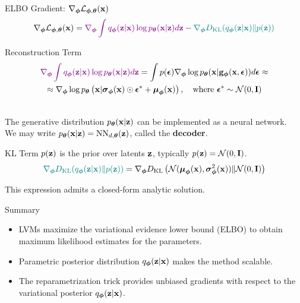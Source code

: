\documentclass{beamer}
\renewcommand{\eqpause}{}
\begin{document}
\begin{frame}{ELBO Gradient: $\nabla_{\boldsymbol{\phi}} \mathcal{L}_{\boldsymbol{\phi}, \boldsymbol{\theta}}(\mathbf{x})$}
	\vspace{-0.3cm}
	\[
		\nabla_{\boldsymbol{\phi}} \mathcal{L}_{\boldsymbol{\phi}, \boldsymbol{\theta}}(\mathbf{x}) = {\color{violet}\nabla_{\boldsymbol{\phi}} \int q_{\boldsymbol{\phi}}(\mathbf{z}| \mathbf{x})\log p_{\boldsymbol{\theta}}(\mathbf{x} | \mathbf{z}) d \mathbf{z}} - {\color{teal}\nabla_{\boldsymbol{\phi}} D_\mathrm{KL}(q_{\boldsymbol{\phi}}(\mathbf{z}| \mathbf{x}) \| p(\mathbf{z}))}
	\]
	\eqpause
	\vspace{-0.3cm}
	\begin{block}{Reconstruction Term}
		\vspace{-0.7cm}
		\begin{multline*}
			 {\color{violet}\nabla_{\boldsymbol{\phi}} \int q_{\boldsymbol{\phi}}(\mathbf{z}| \mathbf{x})\log p_{\boldsymbol{\theta}}(\mathbf{x}| \mathbf{z}) d \mathbf{z}} = \int p(\boldsymbol{\epsilon}) \nabla_{\boldsymbol{\phi}} \log p_{\boldsymbol{\theta}}(\mathbf{x} | \mathbf{g}_{\boldsymbol{\phi}}(\mathbf{x}, \boldsymbol{\epsilon})) d\boldsymbol{\epsilon} \approx \\
			 \approx \nabla_{\boldsymbol{\phi}} \log p_{\boldsymbol{\theta}}\left(\mathbf{x} | \boldsymbol{\sigma}_{\boldsymbol{\phi}}(\mathbf{x}) \odot \boldsymbol{\epsilon}^* + \boldsymbol{\mu}_{\boldsymbol{\phi}}(\mathbf{x})\right), \quad \text{where } \boldsymbol{\epsilon}^* \sim \mathcal{N}(0, \mathbf{I})
		\end{multline*}
		\eqpause
		\vspace{-0.5cm} \\
		The generative distribution $p_{\boldsymbol{\theta}}(\mathbf{x} | \mathbf{z})$ can be implemented as a neural network. \\
		We may write $p_{\boldsymbol{\theta}}(\mathbf{x} | \mathbf{z}) = \mathrm{NN}_{d, \boldsymbol{\theta}}(\mathbf{z})$, called the \textbf{decoder}.
	\end{block}
	\eqpause
	\begin{block}{KL Term}
		$p(\mathbf{z})$ is the prior over latents $\mathbf{z}$, typically $p(\mathbf{z}) = \mathcal{N} (0, \mathbf{I})$.
		\[
			{\color{teal}\nabla_{\boldsymbol{\phi}} D_\mathrm{KL}(q_{\boldsymbol{\phi}}(\mathbf{z}| \mathbf{x}) \| p(\mathbf{z}))} = \nabla_{\boldsymbol{\phi}} D_\mathrm{KL}\left( \mathcal{N} (\boldsymbol{\mu}_{\boldsymbol{\phi}}(\mathbf{x}), \boldsymbol{\sigma}^2_{\boldsymbol{\phi}}(\mathbf{x})) \| \mathcal{N} (0, \mathbf{I}) \right)
		\]
		\eqpause
		This expression admits a closed-form analytic solution.
	\end{block}
\end{frame}
\begin{frame}{Summary}
	\begin{itemize}
		\item LVMs maximize the variational evidence lower bound (ELBO) to obtain maximum likelihood estimates for the parameters.
		\vfill
		\item Parametric posterior distribution $q_{\boldsymbol{\phi}}(\mathbf{z}| \mathbf{x})$ makes the method scalable.
		\vfill
		\item The reparametrization trick provides unbiased gradients with respect to the variational posterior $q_{\boldsymbol{\phi}}(\mathbf{z}| \mathbf{x})$.
	\end{itemize}
\end{frame}
\end{document}
